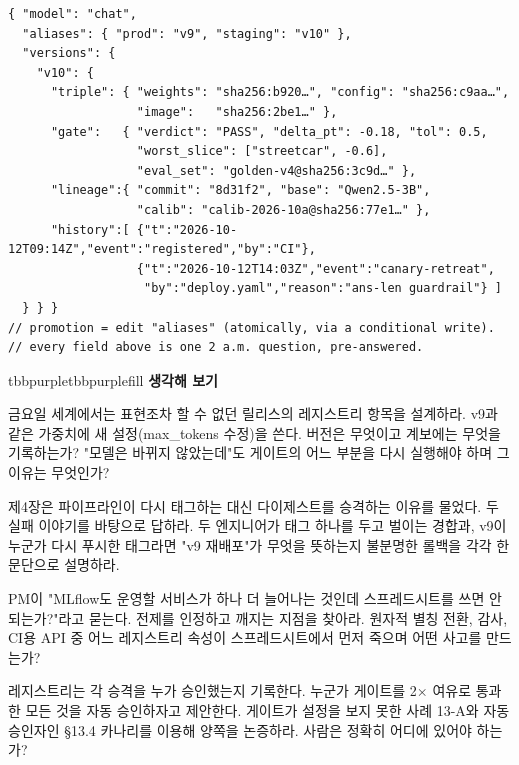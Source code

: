 \begin{terminalbox}
\begin{Verbatim}[breaklines=true,breakanywhere=true,fontsize=\small,formatcom=\color{tbbtermfg},codes=\tbbcodeactive]
{ "model": "chat",
  "aliases": { "prod": "v9", "staging": "v10" },
  "versions": {
    "v10": {
      "triple": { "weights": "sha256:b920…", "config": "sha256:c9aa…",
                  "image":   "sha256:2be1…" },
      "gate":   { "verdict": "PASS", "delta_pt": -0.18, "tol": 0.5,
                  "worst_slice": ["streetcar", -0.6],
                  "eval_set": "golden-v4@sha256:3c9d…" },
      "lineage":{ "commit": "8d31f2", "base": "Qwen2.5-3B",
                  "calib": "calib-2026-10a@sha256:77e1…" },
      "history":[ {"t":"2026-10-12T09:14Z","event":"registered","by":"CI"},
                  {"t":"2026-10-12T14:03Z","event":"canary-retreat",
                   "by":"deploy.yaml","reason":"ans-len guardrail"} ]
  } } }
// promotion = edit "aliases" (atomically, via a conditional write).
// every field above is one 2 a.m. question, pre-answered.
\end{Verbatim}
\end{terminalbox}

\begin{calloutbox}{tbbpurple}{tbbpurplefill}
{\normalsize\bfseries\color{tbbpurple}생각해 보기}\par\vspace{3pt}
\begin{tbbitemize}
  \item 금요일 세계에서는 표현조차 할 수 없던 릴리스의 레지스트리 항목을 설계하라. v9과 같은 가중치에 새 설정(max\_tokens 수정)을 쓴다. 버전은 무엇이고 계보에는 무엇을 기록하는가? "모델은 바뀌지 않았는데"도 게이트의 어느 부분을 다시 실행해야 하며 그 이유는 무엇인가?
  \item 제4장은 파이프라인이 다시 태그하는 대신 다이제스트를 승격하는 이유를 물었다. 두 실패 이야기를 바탕으로 답하라. 두 엔지니어가 태그 하나를 두고 벌이는 경합과, v9이 누군가 다시 푸시한 태그라면 "v9 재배포"가 무엇을 뜻하는지 불분명한 롤백을 각각 한 문단으로 설명하라.
  \item PM이 "MLflow도 운영할 서비스가 하나 더 늘어나는 것인데 스프레드시트를 쓰면 안 되는가?"라고 묻는다. 전제를 인정하고 깨지는 지점을 찾아라. 원자적 별칭 전환, 감사, CI용 API 중 어느 레지스트리 속성이 스프레드시트에서 먼저 죽으며 어떤 사고를 만드는가?
  \item 레지스트리는 각 승격을 누가 승인했는지 기록한다. 누군가 게이트를 2× 여유로 통과한 모든 것을 자동 승인하자고 제안한다. 게이트가 설정을 보지 못한 사례 13-A와 자동 승인자인 §13.4 카나리를 이용해 양쪽을 논증하라. 사람은 정확히 어디에 있어야 하는가?
\end{tbbitemize}
\end{calloutbox}

